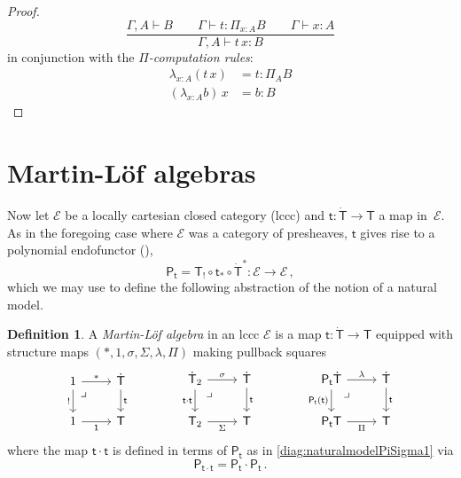 \documentclass[12pt,reqno]{amsart}
\newcommand{\EE}{\ensuremath{\mathcal{E}}}
\newcommand{\alg}[1]{\ensuremath{\mathsf{#1}}}
\renewcommand{\to}{\ensuremath{\rightarrow}}
\newcommand{\too}{\ensuremath{\longrightarrow}}
\newcommand{\G}{\ensuremath{\Gamma}}
\newcommand{\ext}[2]{{#1,#2}}
\renewcommand{\t}{\ensuremath{\mathsf{t}}}
\newcommand{\tT}{\ensuremath{{\t}:\TT\to\T}}
\newcommand{\T}{\ensuremath{\mathsf{T}}}
\newcommand{\TT}{\ensuremath{\dot{\mathsf{T}}}}
\newcommand{\pbcorner}{\arrow[dr,phantom,"\lrcorner" very near start, shift right=.5ex]} %
\theoremstyle{remark}
\theoremstyle{definition}
\newtheorem{definition}[theorem]{Definition}
\begin{document}
\begin{proof}
\[
\frac{{\ext{\G}{A} \vdash B}\qquad {\G \vdash t : \Pi_{x:A}  B} \qquad {\G \vdash x:A}}{{\ext{\G}{A}\vdash t\, x :B}}
\]
in conjunction with the \emph{$\Pi$-computation rules}:
\begin{align*}
\lambda_{x:A} (t\,x) &= t : \Pi_A B\\
(\lambda_{x:A} b)\,x &= b : B
\end{align*}
\end{proof}
%

\section{Martin-L\"of algebras}\label{sec:MLalgebras}

Now let $\EE$ be a locally cartesian closed category (lccc) and $\tT$ a map in~$\EE$.  As in the foregoing case where $\EE$ was a category of presheaves, $\t$ gives rise to a polynomial endofunctor  (\cite{GK}),
$$\alg{P}_\t = \T_! \circ \t_* \circ \TT^* : \EE\too\EE\,,$$
which we may use to define the following abstraction of the notion of a natural model.
\begin{definition}\label{def:MLalg}
A \emph{Martin-L\"of algebra} in an lccc $\EE$ is a map $\tT$ equipped with structure maps $(*, 1, \sigma, \Sigma, \lambda, \Pi)$ making pullback squares 
\begin{equation}\label{diag:MLalg}
\begin{tikzcd}
	1 \ar[r,"*"] \ar[d,swap,"!"] \pbcorner &  \TT \ar[d, "\t"]\\  
	1 \ar[r, swap,"\mathsf{1}"] & \T
 \end{tikzcd}\qquad \qquad 
 \begin{tikzcd}
	\TT_2  \ar[r,"\sigma"] \ar[d,swap,"\t\cdot\t"] \pbcorner &  \TT \ar[d, "\t"]\\  
	\T_2 \ar[r,swap, "\Sigma"] & \T
\end{tikzcd} \qquad \qquad 
	 \begin{tikzcd}
	\alg{P}_\t\TT \ar[r,"\lambda"] \ar[d,swap,"\alg{P}_\t(\t)"] \pbcorner &  \TT \ar[d, "\t"]\\  
	\alg{P}_\t\T \ar[r,swap, "\Pi"] & \T
 \end{tikzcd} 
 \end{equation}
 where the map $\t\cdot\t$ is defined in terms of $\alg{P}_\t$ as in \eqref{diag:naturalmodelPiSigma1} via
 \[
\alg{P}_{\t\cdot\t} = \alg{P}_{\t}\cdot \alg{P}_{\t}\,.
 \]
   \end{definition}
\end{document}
